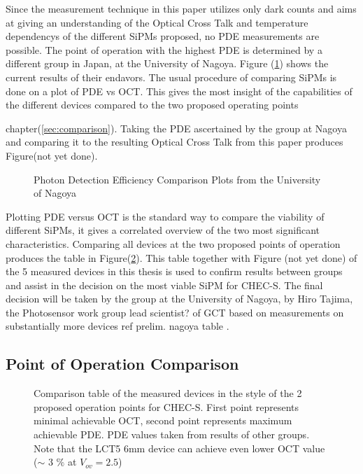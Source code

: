 \documentclass[12pt,article,type=msc,colorback,accentcolor=tud9c]{tudthesis}
\begin{document}
Since the measurement technique in this paper utilizes only dark counts and aims at giving an understanding of the Optical Cross Talk and temperature dependencys of the different SiPMs proposed, no PDE measurements are possible. The point of operation with the highest PDE is determined by a different group in Japan, at the University of Nagoya. Figure (\ref{fig:Nagoya_PDE}) shows the current results of their endavors. The usual procedure of comparing SiPMs is done on a plot of PDE vs OCT. This gives the most insight of the capabilities of the different devices compared to the two proposed operating points {chapter(\ref{sec:comparison}). Taking the PDE ascertained by the group at Nagoya and comparing it to the resulting Optical Cross Talk from this paper produces Figure(not yet done). 


\begin{figure}[h]
\begin{centering}
\caption{Photon Detection Efficiency Comparison Plots from the University of Nagoya}
\label{fig:Nagoya_PDE}
\end{centering}
\end{figure}

Plotting PDE versus OCT is the standard way to compare the viability of different SiPMs, it gives a correlated overview of the two most significant characteristics. Comparing all devices at the two proposed points of operation produces the table in Figure(\ref{fig:DC_Table}). This table together with Figure (not yet done) of the 5 measured devices in this thesis is used to confirm results between groups and assist in the decision on the most viable SiPM for CHEC-S. The final decision will be taken by the group at the University of Nagoya, by Hiro Tajima, the Photosensor work group lead scientist? of GCT based on measurements on substantially more devices ref {prelim. nagoya table} .

\subsection{Point of Operation Comparison}
\begin{figure}[h]
\begin{centering}
\caption{Comparison table of the measured devices in the style of the 2 proposed operation points for CHEC-S. First point represents minimal achievable OCT, second point represents maximum achievable PDE. PDE values taken from results of other groups. Note that the LCT5 6mm device can achieve even lower OCT value ($\sim$ 3 $\%$ at $V_{ov}=2.5$)}
\label{fig:DC_Table}
\end{centering}
\end{figure}


}
\end{document}
